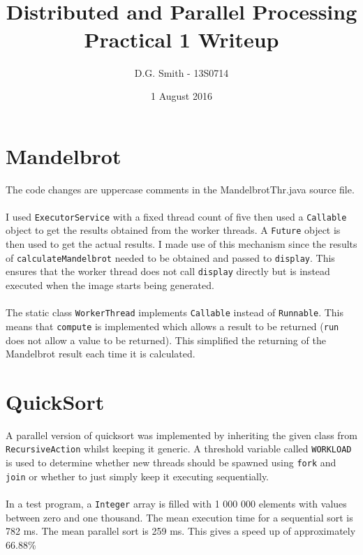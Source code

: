 \documentclass[12pt,a4paper,oneside]{article}
\def\code#1{\texttt{#1}}
\begin{document}
  \title{
    \\Distributed and Parallel Processing\\
    Practical 1 Writeup
  }
  \author{
    D.G. Smith - 13S0714
  }
  \date {1 August 2016}
  \maketitle
  \section{Mandelbrot}
    The code changes are uppercase comments in the MandelbrotThr.java source file.
    \\\\
    I used \code{ExecutorService} with a fixed thread count of five then used a
    \code{Callable} object to get the results obtained from the worker threads.
    A \code{Future} object is then used to get the actual results. I made use of this mechanism since the results of \code{calculateMandelbrot} needed to be obtained and passed to \code{display}. This ensures that the worker thread does not call \code{display} directly but is instead executed
    when the image starts being generated.
    \\\\
    The static class \code{WorkerThread} implements \code{Callable} instead
    of \code{Runnable}. This means that \code{compute} is implemented which allows
    a result to be returned (\code{run} does not allow a value to be returned).
    This simplified the returning of the Mandelbrot result each time it is calculated.
  \section{QuickSort}
    A parallel version of quicksort was implemented by inheriting the given class from
    \code{RecursiveAction} whilst keeping it generic. A threshold variable called
    \code{WORKLOAD} is used to determine whether new threads should be spawned
    using \code{fork} and \code{join} or whether to just simply keep it executing sequentially.
    \\\\
    In a test program, a \code{Integer} array is filled with 1 000 000
    elements with values between zero and one thousand. The mean execution time
    for a sequential sort is 782 ms. The mean parallel sort is 259 ms.
    This gives a speed up of approximately 66.88\%
\end{document}
